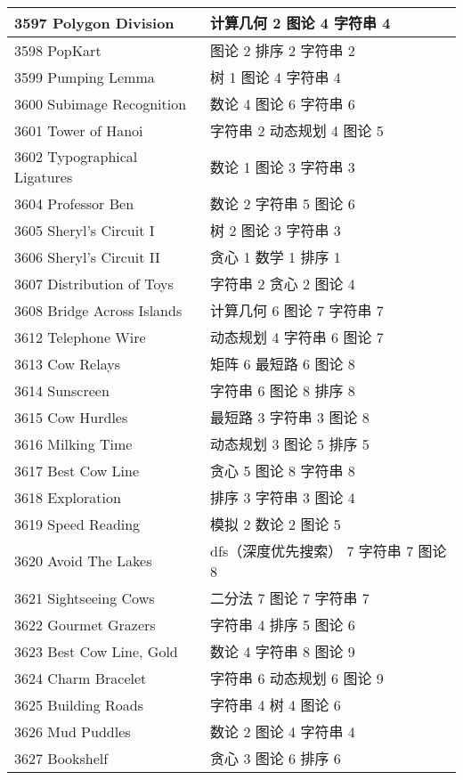 \begin{longtable}{| p{} | p{} |}
 3597 Polygon Division  & 计算几何 2 图论 4 字符串 4 \\ \hline
 3598 PopKart  & 图论 2 排序 2 字符串 2 \\ \hline
 3599 Pumping Lemma  & 树 1 图论 4 字符串 4 \\ \hline
 3600 Subimage Recognition  & 数论 4 图论 6 字符串 6 \\ \hline
 3601 Tower of Hanoi  & 字符串 2 动态规划 4 图论 5 \\ \hline
 3602 Typographical Ligatures  & 数论 1 图论 3 字符串 3 \\ \hline
 3604 Professor Ben  & 数论 2 字符串 5 图论 6 \\ \hline
 3605 Sheryl's Circuit I  & 树 2 图论 3 字符串 3 \\ \hline
 3606 Sheryl's Circuit II  & 贪心 1 数学 1 排序 1 \\ \hline
 3607 Distribution of Toys  & 字符串 2 贪心 2 图论 4 \\ \hline
 3608 Bridge Across Islands  & 计算几何 6 图论 7 字符串 7 \\ \hline
 3612 Telephone Wire  & 动态规划 4 字符串 6 图论 7 \\ \hline
 3613 Cow Relays  & 矩阵 6 最短路 6 图论 8 \\ \hline
 3614 Sunscreen  & 字符串 6 图论 8 排序 8 \\ \hline
 3615 Cow Hurdles  & 最短路 3 字符串 3 图论 8 \\ \hline
 3616 Milking Time  & 动态规划 3 图论 5 排序 5 \\ \hline
 3617 Best Cow Line  & 贪心 5 图论 8 字符串 8 \\ \hline
 3618 Exploration  & 排序 3 字符串 3 图论 4 \\ \hline
 3619 Speed Reading  & 模拟 2 数论 2 图论 5 \\ \hline
 3620 Avoid The Lakes  & dfs（深度优先搜索） 7 字符串 7 图论 8 \\ \hline
 3621 Sightseeing Cows  & 二分法 7 图论 7 字符串 7 \\ \hline
 3622 Gourmet Grazers  & 字符串 4 排序 5 图论 6 \\ \hline
 3623 Best Cow Line, Gold  & 数论 4 字符串 8 图论 9 \\ \hline
 3624 Charm Bracelet  & 字符串 6 动态规划 6 图论 9 \\ \hline
 3625 Building Roads  & 字符串 4 树 4 图论 6 \\ \hline
 3626 Mud Puddles  & 数论 2 图论 4 字符串 4 \\ \hline
 3627 Bookshelf  & 贪心 3 图论 6 排序 6 \\ \hline

\end{longtable}
